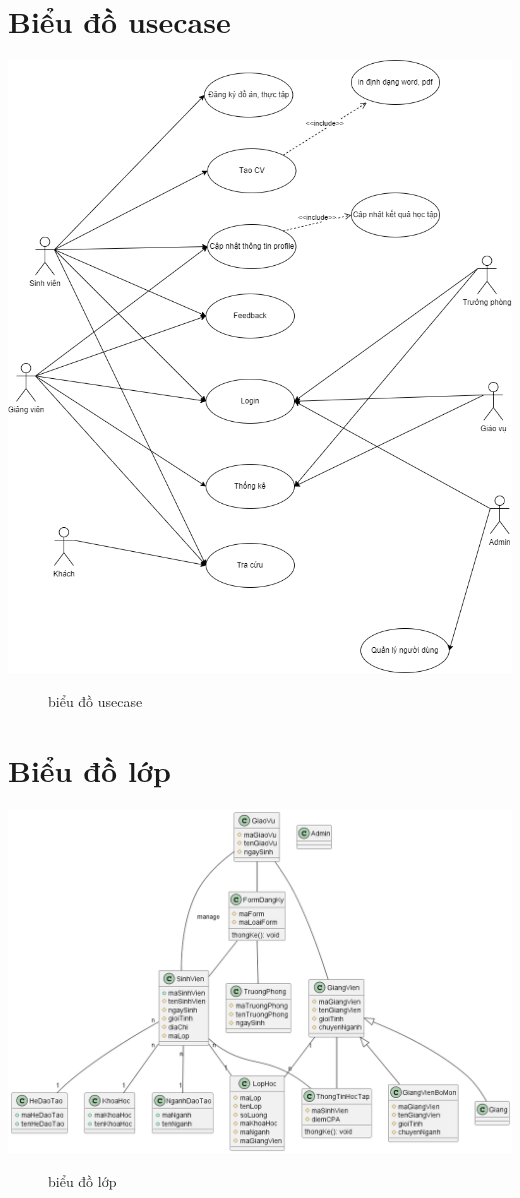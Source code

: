 \section{Biểu đồ usecase}
\begin{center}
	\includegraphics[width=1.\textwidth]{image/use_case.png}
	\begin{figure}[h]
		\centering
		\caption{biểu đồ usecase}
	\end{figure}
\end{center}

\section{Biểu đồ lớp}
\begin{center}
	\includegraphics[width=1.2\textwidth]{image/class.png}
	\begin{figure}[h]
		\centering
		\caption{biểu đồ lớp}
	\end{figure}
\end{center}





